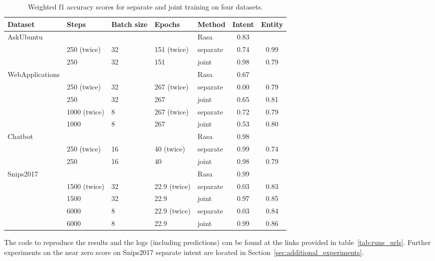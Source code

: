 \begin{table}[htbp]
    \centering
    \begin{tabular}{l l l l l c c}
        \textbf{Dataset}    & \textbf{Steps}  & \textbf{Batch size} & \textbf{Epochs}  & \textbf{Method}   & \textbf{Intent}  & \textbf{Entity}\\
        \hline
        AskUbuntu           & & & & Rasa & 0.83 \\
                            & 250 (twice) & 32 & 151 (twice) &  separate & 0.74 & 0.99\\
                            & 250 & 32 & 151 & joint & 0.98 & 0.79\\
        \hline
        WebApplications     & & & & Rasa & 0.67\\
                            & 250 (twice) & 32 & 267 (twice) & separate & 0.00 & 0.79\\
                            & 250 & 32 & 267 & joint & 0.65 & 0.81\\
                            & 1000 (twice) & 8 & 267 (twice) & separate & 0.72 & 0.79\\
                            & 1000 & 8 & 267 & joint & 0.53 & 0.80\\
        \hline
        Chatbot             & & & & Rasa & 0.98 \\
                            & 250 (twice) & 16 & 40 (twice) & separate & 0.99 & 0.74\\
                            & 250 & 16 & 40 & joint & 0.98 & 0.79\\
        \hline
        Snips2017           & & & & Rasa & 0.99\\
                            & 1500 (twice) & 32 & 22.9 (twice) & separate & 0.03 & 0.83\\
                            & 1500 & 32 & 22.9 & joint & 0.97 & 0.85\\
                            & 6000 & 8 & 22.9 (twice) & separate & 0.03 & 0.84 \\
                            & 6000 & 8 & 22.9 & joint & 0.99 & 0.86 \\
        \hline
    \end{tabular}
    \caption{Weighted f1 accuracy scores for separate and joint training on four datasets.}
    \label{tab:runs_scores}
\end{table}

The code to reproduce the results and the logs (including predictions) can be found at the links provided in table~\ref{tab:runs_urls}.
Further experiments on the near zero score on Snips2017 separate intent are located in Section~\ref{sec:additional_experiments}.

